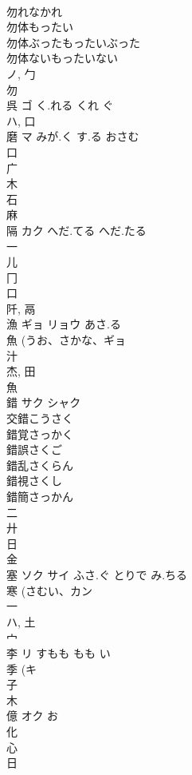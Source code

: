 \documentclass[8pt]{extreport}
\begin{document}
\begin{CJK}{UTF8}{min}
\\	勿れなかれ 
\\	勿体もったい 
\\	勿体ぶったもったいぶった 
\\	勿体ないもったいない 
\\	ノ, 勹 
\\	勿 
\\	呉	ゴ	く.れる くれ ぐ	
\\	ハ, 口 
\\	磨	マ	みが.く す.る おさむ	
\\	口 
\\	广 
\\	木 
\\	石 
\\	麻 
\\	隔	カク	へだ.てる へだ.たる	
\\	一 
\\	儿 
\\	冂 
\\	口 
\\	阡, 鬲 
\\	漁	ギョ リョウ	あさ.る	
\\	魚 (うお、さかな、ギョ 
\\	汁 
\\	杰, 田 
\\	魚 
\\	錯	サク シャク		
\\	交錯こうさく
\\	錯覚さっかく
\\	錯誤さくご
\\	錯乱さくらん
\\	錯視さくし
\\	錯簡さっかん
\\	二 
\\	廾 
\\	日 
\\	金 
\\	塞	ソク サイ	ふさ.ぐ とりで み.ちる	
\\	寒 (さむい、カン 
\\	一 
\\	ハ, 土 
\\	宀 
\\	李	リ	すもも もも い	
\\	季 (キ 
\\	子 
\\	木 
\\	億	オク	お	
\\	化 
\\	心 
\\	日 

\end{CJK}
\end{document}
